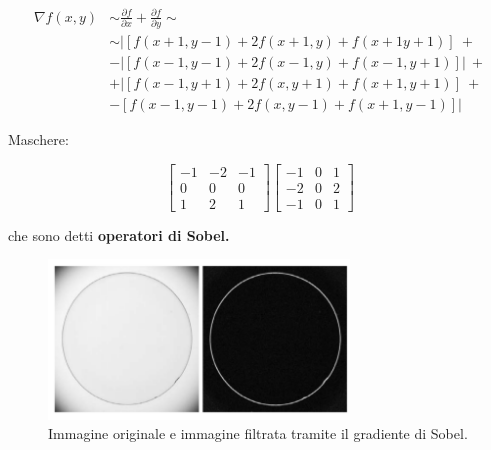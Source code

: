 \begin{align*}
    \nabla f(x,y) & \sim \frac{\partial{f}}{\partial{x}} + \frac{\partial{f}}{\partial{y}} \sim \\
                  & \sim  |[f(x+1,y-1) + 2f(x+1,y) + f(x+1 y+1)]  \ +                           \\
                  & - |[f(x-1, y-1)+2f(x-1,y) + f(x-1, y+1)]|     \ +                           \\
                  & + |[f(x-1, y+1) + 2f(x,y+1)+f(x+1,y+1)]       \ +                           \\
                  & - [f(x-1,y -1) + 2f(x,y-1) + f(x+1,y-1)]|
\end{align*}

Maschere:

\begin{center}
    \[
        \begin{bmatrix}
            -1 & -2 & -1 \\
            0  & 0  & 0  \\
            1  & 2  & 1
        \end{bmatrix}
        \begin{bmatrix}
            -1 & 0 & 1 \\
            -2 & 0 & 2 \\
            -1 & 0 & 1
        \end{bmatrix}
    \]
\end{center}

che sono detti \textbf{operatori di Sobel.}

\begin{figure}[H]
    \centering
    \includegraphics[width=8cm, keepaspectratio]{capitoli/immagini/imgs/sobel.png}
    \caption{Immagine originale e immagine filtrata tramite il gradiente di Sobel.}
\end{figure}

